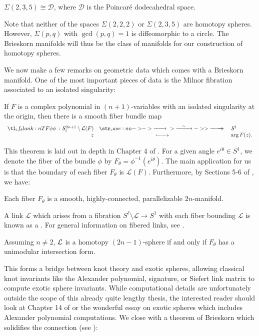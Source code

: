 \begin{proposition}
	$\Sigma(2,3,5)\cong \mathscr{D}$, where $\mathscr{D}$ is the Poincar\'e dodecahedral space.
\end{proposition}

Note that neither of the spaces $\Sigma(2,2,2)$ or $\Sigma(2,3,5)$ are homotopy spheres. However, $\Sigma(p,q)$ with $\gcd(p,q)=1$ is diffeomorphic to a circle. The Brieskorn manifolds will thus be the class of manifolds for our construction of homotopy spheres.

We now make a few remarks on geometric data which comes with a Brieskorn manifold. One of the most important pieces of data is the Milnor fibration associated to an isolated singularity:

\begin{theorem}\label{thm:fibration}
	If $F$ is a complex polynomial in $(n+1)$-variables with an isolated singularity at the origin, then there is a smooth fiber bundle map
	\[
		\lkxfunc{\phi}{S^{2n+1}_\varepsilon \setminus \L(F)}{S^1}{z}{\arg F(z).}
	\]
\end{theorem}

This theorem is laid out in depth in Chapter 4 of \cite{milnor1968hypersurfaces}. For a given angle $e^{i\theta}\in S^1$, we denote the fiber of the bundle $\phi$ by $F_\theta = \phi^{-1}(e^{i\theta})$. The main application for us is that the boundary of each fiber $F_\theta$ is $\mathcal{L}(F)$. Furthermore, by Sections 5-6 of \cite{milnor1968hypersurfaces}, we have:

\begin{proposition}
	Each fiber $F_\theta$ is a smooth, highly-connected, parallelizable $2n$-manifold.
\end{proposition}

\begin{remark*}
	A link $\mathcal{L}$ which arises from a fibration $S^\ell \setminus \mathcal{L} \to S^1$ with each fiber bounding $\mathcal{L}$ is known as a .
	For general information on fibered links, see \cite{kauffmanneumann1977}.
\end{remark*}

\begin{proposition}
	Assuming $n\neq 2$, $\mathcal{L}$ is a homotopy $(2n-1)$-sphere if and only if $F_\theta$ has a unimodular intersection form.
\end{proposition}
This forms a bridge between knot theory and exotic spheres, allowing classical knot invariants like the Alexander polynomial, signature, or Siefert link matrix to compute exotic sphere invariants.
While computational details are unfortunately outside the scope of this already quite lengthy thesis, the interested reader should look at Chapter 14 of \cite{baadhio1996quantum} or the wonderful essay on exotic spheres \cite{nicholson} which includes Alexander polynomial computations.  We close with a theorem of Brieskorn which solidifies the connection (see \cite{brieskorn1966}):


